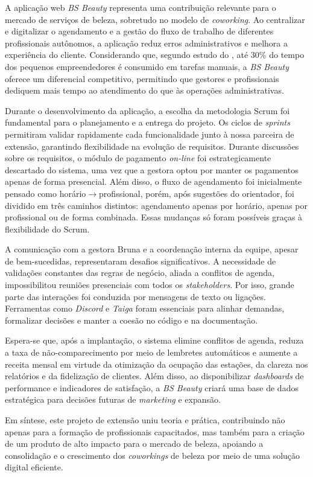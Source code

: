 

A aplicação web \emph{BS Beauty} representa uma contribuição relevante para o mercado de serviços de beleza, sobretudo no modelo de \emph{coworking}. Ao centralizar e digitalizar o agendamento e a gestão do fluxo de trabalho de diferentes profissionais autônomos, a aplicação reduz erros administrativos e melhora a experiência do cliente. Considerando que, segundo estudo do \cite{senac2022}, até 30\% do tempo dos pequenos empreendedores é consumido em tarefas manuais, a \emph{BS Beauty} oferece um diferencial competitivo, permitindo que gestores e profissionais dediquem mais tempo ao atendimento do que às operações administrativas.

Durante o desenvolvimento da aplicação, a escolha da metodologia Scrum foi fundamental para o planejamento e a entrega do projeto. Os ciclos de \emph{sprints} permitiram validar rapidamente cada funcionalidade junto à nossa parceira de extensão, garantindo flexibilidade na evolução de requisitos. Durante discussões sobre os requisitos, o módulo de pagamento \emph{on-line} foi estrategicamente descartado do sistema, uma vez que a gestora optou por manter os pagamentos apenas de forma presencial. Além disso, o fluxo de agendamento foi inicialmente pensado como horário$\to$profissional, porém, após sugestões do orientador, foi dividido em três caminhos distintos: agendamento apenas por horário, apenas por profissional ou de forma combinada. Essas mudanças só foram possíveis graças à flexibilidade do Scrum.

A comunicação com a gestora Bruna e a coordenação interna da equipe, apesar de bem-sucedidas, representaram desafios significativos. A necessidade de validações constantes das regras de negócio, aliada a conflitos de agenda, impossibilitou reuniões presenciais com todos os \emph{stakeholders}. Por isso, grande parte das interações foi conduzida por mensagens de texto ou ligações. Ferramentas como \emph{Discord} e \emph{Taiga} foram essenciais para alinhar demandas, formalizar decisões e manter a coesão no código e na documentação.

Espera-se que, após a implantação, o sistema elimine conflitos de agenda, reduza a taxa de não-comparecimento por meio de lembretes automáticos e aumente a receita mensal em virtude da otimização da ocupação das estações, da clareza nos relatórios e da fidelização de clientes. Além disso, ao disponibilizar \emph{dashboards} de performance e indicadores de satisfação, a \emph{BS Beauty} criará uma base de dados estratégica para decisões futuras de \emph{marketing} e expansão.

Em síntese, este projeto de extensão uniu teoria e prática, contribuindo não apenas para a formação de profissionais capacitados, mas também para a criação de um produto de alto impacto para o mercado de beleza, apoiando a consolidação e o crescimento dos \emph{coworkings} de beleza por meio de uma solução digital eficiente.
